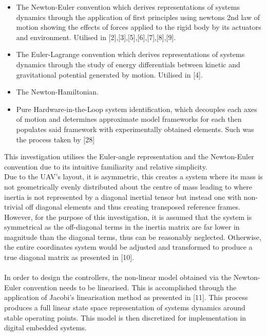 \documentclass[12pt,a4paper,twoside]{report}
\begin{document}
				\begin{itemize}
					\item
						The Newton-Euler convention which derives representations of systems dynamics through the application of first principles using newtons 2nd law of motion showing the effects of forces applied to the rigid body by its actuators and environment. Utilised in [2],[3],[5],[6],[7],[8],[9].
					\item 
						The Euler-Lagrange convention which derives representations of systems dynamics through the study of energy differentials between kinetic and gravitational potential generated by motion. Utilised in [4]. 
					\item 
						The Newton-Hamiltonian.
					\item 
						Pure Hardware-in-the-Loop system identification, which decouples each axes of motion and determines approximate model frameworks for each then populates said framework with experimentally obtained elements. Such was the process taken by [28]
				\end{itemize}
				\space
				This investigation utilises the Euler-angle representation and the Newton-Euler convention due to its intuitive familiarity and relative simplicity.
				\\
				Due to the UAV's layout, it is asymmetric, this creates a system where its mass is not geometrically evenly distributed about the centre of mass leading to where inertia is not represented by a diagonal inertial tensor but instead one with non-trivial off diagonal elements and thus creating transposed reference frames. However, for the purpose of this investigation, it is assumed that the system is symmetrical as the off-diagonal terms in the inertia matrix are far lower in magnitude than the diagonal terms, thus can be reasonably neglected. Otherwise, the entire coordinates system would be adjusted and transformed to produce a true diagonal matrix as presented in [10]. 
				\\ \\
				In order to design the controllers, the non-linear model obtained via the Newton-Euler convention needs to be linearised. This is accomplished through the application of Jacobi’s linearisation method as presented in [11]. This process produces a full linear state space representation of systems dynamics around stable operating points. This model is then discretized for implementation in digital embedded systems.
				
\end{document}
